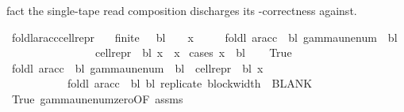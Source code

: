 \begin{isabellebody}
\begin{isamarkuptext}
  fact the single-tape read composition discharges its -correctness against.%
\end{isamarkuptext}\isamarkuptrue%
\isamarkupfalse%
\ foldl{\isacharunderscore}{\kern0pt}ar{\isacharunderscore}{\kern0pt}acc{\isacharunderscore}{\kern0pt}cell{\isacharunderscore}{\kern0pt}repr{\isacharcolon}{\kern0pt}\isanewline
\ \ \ {\isachardoublequoteopen}finite\ {\isasymGamma}{\isachardoublequoteclose}\ \ {\isachardoublequoteopen}bl\ {\isasymin}\ {\isasymGamma}{\isachardoublequoteclose}\ \ {\isachardoublequoteopen}x\ {\isasymin}\ {\isasymGamma}{\isachardoublequoteclose}\isanewline
\ \ \ {\isachardoublequoteopen}foldl\ {\isacharparenleft}{\kern0pt}ar{\isacharunderscore}{\kern0pt}acc\ {\isasymGamma}\ bl{\isacharparenright}{\kern0pt}\ {\isacharparenleft}{\kern0pt}gamma{\isacharunderscore}{\kern0pt}unenum\ {\isasymGamma}\ bl\ {}{\isacharparenright}{\kern0pt}\isanewline
\ \ \ \ \ \ \ \ \ \ \ \ \ \ \ \ {\isacharparenleft}{\kern0pt}cell{\isacharunderscore}{\kern0pt}repr\ {\isasymGamma}\ bl\ x{\isacharparenright}{\kern0pt}\ {\isacharequal}{\kern0pt}\ x{\isachardoublequoteclose}\isanewline
%
\isadelimproof
%
\endisadelimproof
%
\isatagproof
{}\isamarkupfalse%
\ {\isacharparenleft}{\kern0pt}cases\ {\isachardoublequoteopen}x\ {\isacharequal}{\kern0pt}\ bl{\isachardoublequoteclose}{\isacharparenright}{\kern0pt}\isanewline
\ \ \isamarkupfalse%
\ True\isanewline
\ \ \isamarkupfalse%
\ {\isachardoublequoteopen}foldl\ {\isacharparenleft}{\kern0pt}ar{\isacharunderscore}{\kern0pt}acc\ {\isasymGamma}\ bl{\isacharparenright}{\kern0pt}\ {\isacharparenleft}{\kern0pt}gamma{\isacharunderscore}{\kern0pt}unenum\ {\isasymGamma}\ bl\ {}{\isacharparenright}{\kern0pt}\ {\isacharparenleft}{\kern0pt}cell{\isacharunderscore}{\kern0pt}repr\ {\isasymGamma}\ bl\ x{\isacharparenright}{\kern0pt}\isanewline
\ \ \ \ \ \ \ \ \ \ {\isacharequal}{\kern0pt}\ foldl\ {\isacharparenleft}{\kern0pt}ar{\isacharunderscore}{\kern0pt}acc\ {\isasymGamma}\ bl{\isacharparenright}{\kern0pt}\ bl\ {\isacharparenleft}{\kern0pt}replicate\ {\isacharparenleft}{\kern0pt}block{\isacharunderscore}{\kern0pt}width\ {\isasymGamma}{\isacharparenright}{\kern0pt}\ BLANK{}{\isacharparenright}{\kern0pt}{\isachardoublequoteclose}\isanewline
\ \ \ \ \isamarkupfalse%
\ True\ gamma{\isacharunderscore}{\kern0pt}unenum{\isacharunderscore}{\kern0pt}zero{\isacharbrackleft}{\kern0pt}OF\ assms{\isacharparenleft}{\kern0pt}{}{\isacharcomma}{\kern0pt}{}{\isacharparenright}{\kern0pt}{\isacharbrackright}{\kern0pt}\ \isamarkupfalse%

\end{isabellebody}
